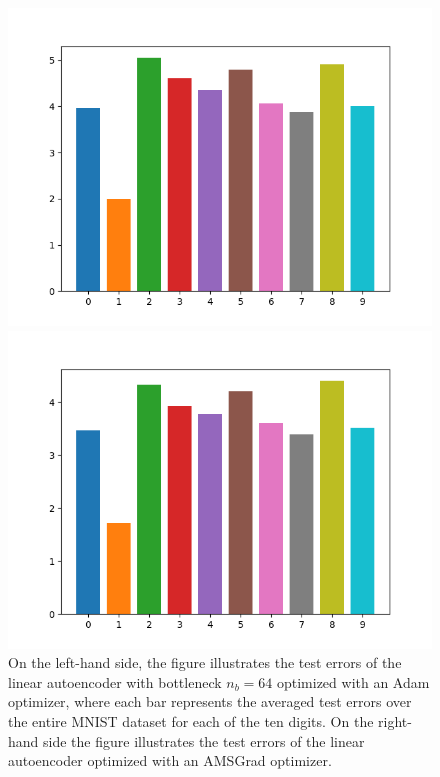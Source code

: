 \begin{figure}
\begin{center}
   \begin{minipage}[b]{0.49\linewidth}
      \includegraphics[trim = 15mm 5mm 15mm 10mm, clip, width=\linewidth]{linear_AE_64d_adam_errors}
	\end{minipage}
   \begin{minipage}[b]{0.49\linewidth}
      \includegraphics[trim = 15mm 5mm 15mm 10mm, clip, width=\linewidth]{linear_AE_64d_amsgrad_errors}
	\end{minipage}
\end{center}
\caption{On the left-hand side, the figure illustrates the test errors of the linear autoencoder with bottleneck $n_b=64$ optimized with an Adam optimizer, where each bar represents the averaged test errors over the entire MNIST dataset for each of the ten digits. On the right-hand side the figure illustrates the test errors of the linear autoencoder optimized with an AMSGrad optimizer.}\label{fig:linear_AE_64d_errors}
\end{figure}

